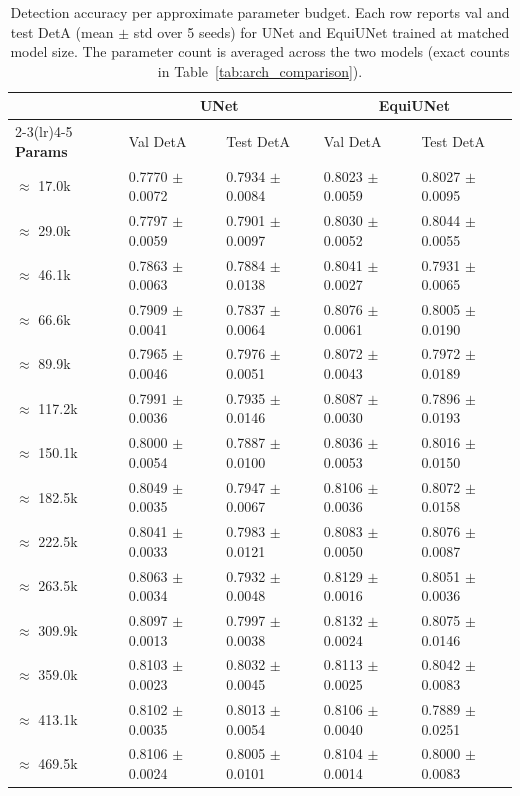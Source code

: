 \begin{table}[ht]
\centering
\caption{Detection accuracy per approximate parameter budget. Each row reports val and test DetA (mean $\pm$ std over 5 seeds) for UNet and EquiUNet trained at matched model size. The parameter count is averaged across the two models (exact counts in Table~\ref{tab:arch_comparison}).}
\label{tab:deta_results}
\begin{tabular}{l ll ll}
\toprule
 & \multicolumn{2}{c}{\textbf{UNet}} & \multicolumn{2}{c}{\textbf{EquiUNet}} \\
\cmidrule(lr){2-3}\cmidrule(lr){4-5}
\textbf{Params} & Val DetA & Test DetA & Val DetA & Test DetA \\
\midrule
$\approx$ 17.0k & 0.7770 $\pm$ 0.0072 & 0.7934 $\pm$ 0.0084 & 0.8023 $\pm$ 0.0059 & 0.8027 $\pm$ 0.0095 \\
$\approx$ 29.0k & 0.7797 $\pm$ 0.0059 & 0.7901 $\pm$ 0.0097 & 0.8030 $\pm$ 0.0052 & 0.8044 $\pm$ 0.0055 \\
$\approx$ 46.1k & 0.7863 $\pm$ 0.0063 & 0.7884 $\pm$ 0.0138 & 0.8041 $\pm$ 0.0027 & 0.7931 $\pm$ 0.0065 \\
$\approx$ 66.6k & 0.7909 $\pm$ 0.0041 & 0.7837 $\pm$ 0.0064 & 0.8076 $\pm$ 0.0061 & 0.8005 $\pm$ 0.0190 \\
$\approx$ 89.9k & 0.7965 $\pm$ 0.0046 & 0.7976 $\pm$ 0.0051 & 0.8072 $\pm$ 0.0043 & 0.7972 $\pm$ 0.0189 \\
$\approx$ 117.2k & 0.7991 $\pm$ 0.0036 & 0.7935 $\pm$ 0.0146 & 0.8087 $\pm$ 0.0030 & 0.7896 $\pm$ 0.0193 \\
$\approx$ 150.1k & 0.8000 $\pm$ 0.0054 & 0.7887 $\pm$ 0.0100 & 0.8036 $\pm$ 0.0053 & 0.8016 $\pm$ 0.0150 \\
$\approx$ 182.5k & 0.8049 $\pm$ 0.0035 & 0.7947 $\pm$ 0.0067 & 0.8106 $\pm$ 0.0036 & 0.8072 $\pm$ 0.0158 \\
$\approx$ 222.5k & 0.8041 $\pm$ 0.0033 & 0.7983 $\pm$ 0.0121 & 0.8083 $\pm$ 0.0050 & 0.8076 $\pm$ 0.0087 \\
$\approx$ 263.5k & 0.8063 $\pm$ 0.0034 & 0.7932 $\pm$ 0.0048 & 0.8129 $\pm$ 0.0016 & 0.8051 $\pm$ 0.0036 \\
$\approx$ 309.9k & 0.8097 $\pm$ 0.0013 & 0.7997 $\pm$ 0.0038 & 0.8132 $\pm$ 0.0024 & 0.8075 $\pm$ 0.0146 \\
$\approx$ 359.0k & 0.8103 $\pm$ 0.0023 & 0.8032 $\pm$ 0.0045 & 0.8113 $\pm$ 0.0025 & 0.8042 $\pm$ 0.0083 \\
$\approx$ 413.1k & 0.8102 $\pm$ 0.0035 & 0.8013 $\pm$ 0.0054 & 0.8106 $\pm$ 0.0040 & 0.7889 $\pm$ 0.0251 \\
$\approx$ 469.5k & 0.8106 $\pm$ 0.0024 & 0.8005 $\pm$ 0.0101 & 0.8104 $\pm$ 0.0014 & 0.8000 $\pm$ 0.0083 \\
\bottomrule
\end{tabular}
\end{table}